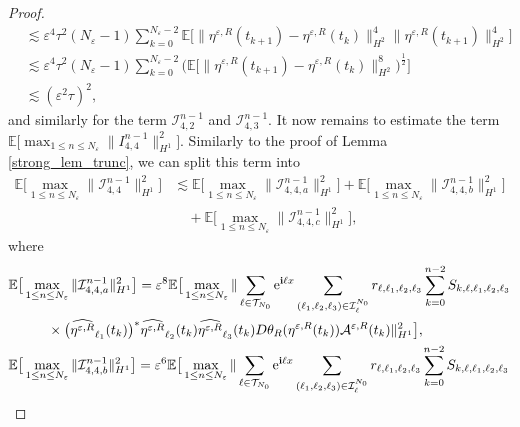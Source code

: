 \documentclass[a4paper]{amsart}
\begin{document}
\begin{proof}
\begin{align*}
       &\lesssim  \varepsilon^4 \tau^2 (N_\varepsilon-1)\sum_{k=0}^{N_\varepsilon-2}\mathbb{E}\big[\|\eta^{\varepsilon,R}(t_{k+1})-\eta^{\varepsilon,R}(t_{k})\|_{H^2}^4 \|\eta^{\varepsilon,R}(t_{k+1})\|^4_{H^2}\big]\\
       &\lesssim \varepsilon^4 \tau^2 (N_\varepsilon-1)\sum_{k=0}^{N_\varepsilon-2}\big(\mathbb{E}\big[\|\eta^{\varepsilon,R}(t_{k+1})-\eta^{\varepsilon,R}(t_{k})\|_{H^2}^8\big)^{\frac{1}{2}} \big]\\
       &\lesssim (\varepsilon^2 \tau)^2,
   \end{align*}
   and similarly for the term $\mathcal{I}_{4,2}^{n-1}$ and $\mathcal{I}^{n-1}_{4,3}$. It now remains to estimate the term $\mathbb{E}\big[\displaystyle\max_{1\le n \le N_\varepsilon}\|I_{4,4}^{n-1}\|_{H^1}^2\big]$. Similarly to the proof of Lemma \ref{strong_lem_trunc}, we can split this term into
   \begin{align*}
   \mathbb{E}\big[\max_{1\le n \le N_\varepsilon}\|\mathcal{I}^{n-1}_{4,4}\|^2_{H^1}\big]&\lesssim  \mathbb{E}\big[\max_{1\le n \le N_\varepsilon}\|\mathcal{I}^{n-1}_{4,4,a}\|^2_{H^1}\big]+ \mathbb{E}\big[\max_{1\le n \le N_\varepsilon}\|\mathcal{I}^{n-1}_{4,4,b}\|^2_{H^1}\big]\\
   &\quad + \mathbb{E}\big[\max_{1\le n \le N_\varepsilon}\|\mathcal{I}^{n-1}_{4,4,c}\|^2_{H^1}\big],
   \end{align*}
   where 
   \begin{align*}
       &\mathbb{E}\big[\max_{1\le n\le N_\varepsilon}\|\mathcal{I}^{n-1}_{4,4,a}\|^2_{H^1}\big] = \varepsilon^8\mathbb{E}\big[\max_{1\le n \le N_\varepsilon}\| \sum_{\ell\in\mathcal{T}_{N_0}}{\rm e}^{{\bf i}\ell x}\sum_{(\ell_1,\ell_2,\ell_3)\in\mathcal{I}_{\ell}^{N_0}}
    r_{\ell,\ell_1,\ell_2,\ell_3}\sum_{k=0}^{n-2}S_{k,\ell,\ell_1,\ell_2,\ell_3}\\
    &\hspace{1cm}\times \big(\widehat{\eta^{\varepsilon,R}}_{\ell_1}(t_{k})\big)^*\widehat{\eta^{\varepsilon,R}}_{\ell_2}(t_{k})\widehat{\eta^{\varepsilon,R}}_{\ell_3}(t_{k})D\theta_R(\eta^{\varepsilon,R}(t_k))\mathcal{A}^{\varepsilon,R}(t_k)\|^2_{H^1}\big],\\
     &\mathbb{E}\big[\max_{1\le n \le N_\varepsilon}\|\mathcal{I}^{n-1}_{4,4,b}\|^2_{H^1}\big] = \varepsilon^6 \mathbb{E}\big[\max_{1\le n\le N_\varepsilon}\|\sum_{\ell\in\mathcal{T}_{N_0}}{\rm e}^{{\bf i}\ell x}\sum_{(\ell_1,\ell_2,\ell_3)\in\mathcal{I}_{\ell}^{N_0}}
    r_{\ell,\ell_1,\ell_2,\ell_3}\sum_{k=0}^{n-2}S_{k,\ell,\ell_1,\ell_2,\ell_3}\\

\end{align*}
\end{proof}
\end{document}
